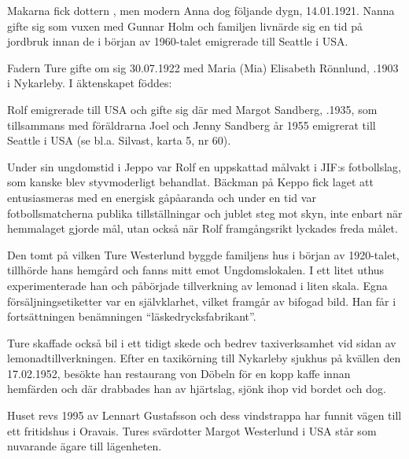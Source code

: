 Makarna fick dottern , men modern Anna dog följande dygn, 14.01.1921. Nanna gifte sig som vuxen med Gunnar Holm och familjen livnärde sig en tid på jordbruk innan de i början av 1960-talet emigrerade till Seattle i USA.

Fadern Ture gifte om sig 30.07.1922 med Maria (Mia) Elisabeth Rönnlund, .1903 i Nykarleby. I äktenskapet föddes:
\begin{jhchildren}
  \item {}
  \item {}
\end{jhchildren}


Rolf emigrerade till USA och gifte sig där med Margot Sandberg, .1935, som tillsammans med föräldrarna Joel och Jenny Sandberg år 1955 emigrerat till Seattle i USA (se bl.a. Silvast, karta 5, nr 60).

Under sin ungdomstid i Jeppo var Rolf en uppskattad målvakt i JIF:s fotbollslag, som kanske blev styvmoderligt behandlat. Bäckman på  Keppo fick laget att entusiasmeras med en energisk gåpåaranda och under en tid var fotbollsmatcherna publika tillställningar och jublet steg mot skyn, inte enbart när hemmalaget gjorde mål, utan också när Rolf framgångsrikt lyckades freda målet.

Den tomt på vilken Ture Westerlund byggde familjens hus i början av 1920-talet, tillhörde hans hemgård och fanns mitt emot Ungdomslokalen. I ett litet uthus experimenterade han och påbörjade tillverkning av lemonad i liten skala. Egna försäljningsetiketter var en självklarhet, vilket framgår av bifogad bild. Han får i fortsättningen benämningen ``läskedrycksfabrikant''.

Ture skaffade också bil i ett tidigt skede och bedrev taxiverksamhet vid sidan av lemonadtillverkningen. Efter en taxikörning till Nykarleby sjukhus på kvällen den 17.02.1952, besökte han restaurang von Döbeln för en kopp kaffe innan hemfärden och där drabbades han av hjärtslag, sjönk ihop vid bordet och dog.

Huset revs 1995 av Lennart Gustafsson och dess vindstrappa har funnit vägen till ett fritidshus i Oravais. Tures svärdotter Margot Westerlund i USA står som nuvarande ägare till lägenheten.

